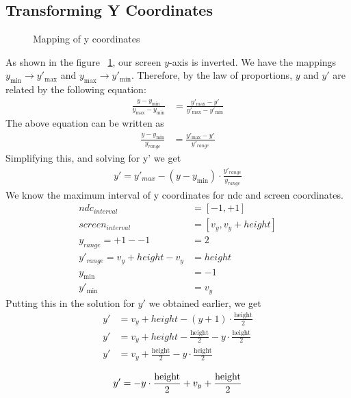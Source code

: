 \subsection{Transforming Y Coordinates}
\begin{figure}[h]
\centering
{}
\caption{Mapping of y coordinates}
\label{fig:viewport-xform-y}
\end{figure}
As shown in the figure ~\ref{fig:viewport-xform-y}, our screen $y$-axis is inverted. We have the mappings $y_{\min} \rightarrow y'_{\max}$ and $y_{\max} \rightarrow y'_{\min}$.  
Therefore, by the law of proportions, $y$ and $y'$ are related by the following equation:
\begin{align*}
\frac{y-y_{\min}}{y_{\max}-y_{\min}} &= \frac{y'_{\max}-y'}{y'_{\max}-y'_{\min}}
\end{align*}
The above equation can be written as 
\begin{align*}
\frac{y-y_{\min}}{y_{range}} &= \frac{y'_{\max}-y'}{y'_{range}}
\end{align*}
Simplifying this, and solving for y' we get 
\begin{align*}
y' = y'_{max}-(y-y_{\min})\cdot \frac{y'_{range}}{y_{range}}
\end{align*}
We know the maximum interval of y coordinates for ndc and screen coordinates.
\begin{align*}
ndc_{interval} &= [-1,+1] \\
screen_{interval} &= [v_y,v_y+height] \\
y_{range} = +1 - -1 &= 2 \\
y'_{range} = v_y+height - v_y &=  height \\
y_{\min} &= -1 \\
y'_{\min} &= v_y
\end{align*}
Putting this in the solution for $y'$ we obtained earlier, we get
\begin{align*}
y' &= v_y + height - (y + 1) \cdot \frac{\text{height}}{2} \\
  y' &= v_y + height - \frac{\text{height}}{2} - y \cdot \frac{\text{height}}{2} \\
  y' &= v_y + \frac{\text{height}}{2} - y \cdot \frac{\text{height}}{2} \\
\end{align*}
\begin{equation}
y' = - y \cdot \frac{\text{height}}{2} + v_y + \frac{\text{height}}{2} \\    
\end{equation}
